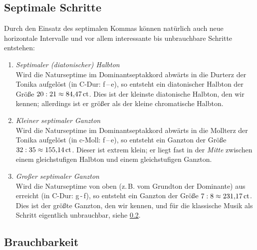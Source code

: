 \subsection{Septimale Schritte}
\label{sec:septSteps}

Durch den Einsatz des septimalen Kommas können natürlich auch neue horizontale
Intervalle und vor allem interessante bis unbrauchbare Schritte entstehen:

\begin{enumerate}
\item \emph{Septimaler (diatonischer) Halbton}\\
  Wird die Naturseptime im Dominantseptakkord abwärts in die Durterz der Tonika
  aufgelöst (in C-Dur: \septimal f\,–\,\naturalm e), so entsteht ein
  diatonischer Halbton der Größe $20:21\approx 84{,}47\,\text{ct}$.  Dies ist der
  kleinste diatonische Halbton, den wir kennen; allerdings ist er größer als der
  kleine chromatische Halbton.
\item \emph{Kleiner septimaler Ganzton}\\
  Wird die Naturseptime im Dominantseptakkord abwärts in die Mollterz der Tonika
  aufgelöst (in c-Moll: \septimal f\,–\,\flatp e), so entsteht ein Ganzton der
  Größe $32:35\approx 155{,}14\,\text{ct}$.  Dieser ist extrem klein; er liegt fast in der
  \emph{Mitte} zwischen einem gleichstufigen Halbton und einem gleichstufigen
  Ganzton.
\item \emph{Großer septimaler Ganzton}\\
  Wird die Naturseptime von oben (z.\,B. vom Grundton der Dominante) aus
  erreicht (in C-Dur: g\,-\,\septimal f), so entsteht ein Ganzton der Größe
  $7:8\approx 231{,}17\,\text{ct}$. Dies ist der größte Ganzton, den wir kennen, und für
  die klassische Musik als Schritt eigentlich unbrauchbar,
  siehe \cref{sec:septmel}.
\end{enumerate}

\subsection{Brauchbarkeit}
\label{sec:septmel}

